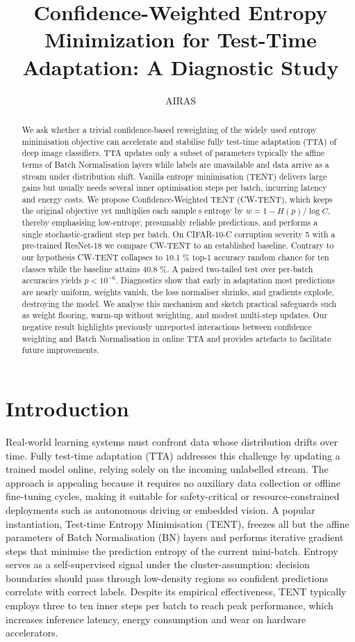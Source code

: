 \documentclass{article} %
\title{Confidence-Weighted Entropy Minimization for Test-Time Adaptation: A Diagnostic Study}
\author{AIRAS}
\begin{document}
\maketitle

\begin{abstract}
We ask whether a trivial confidence-based reweighting of the widely used entropy minimisation objective can accelerate and stabilise fully test-time adaptation (TTA) of deep image classifiers. TTA updates only a subset of parameterstypically the affine terms of Batch Normalisation layerswhile labels are unavailable and data arrive as a stream under distribution shift. Vanilla entropy minimisation (TENT) delivers large gains but usually needs several inner optimisation steps per batch, incurring latency and energy costs. We propose Confidence-Weighted TENT (CW-TENT), which keeps the original objective yet multiplies each samples entropy by \(w = 1 - H(p)/\log C\), thereby emphasising low-entropy, presumably reliable predictions, and performs a single stochastic-gradient step per batch. On CIFAR-10-C corruption severity 5 with a pre-trained ResNet-18 we compare CW-TENT to an established baseline. Contrary to our hypothesis CW-TENT collapses to 10.1 \% top-1 accuracyrandom chance for ten classeswhile the baseline attains 40.8 \%. A paired two-tailed test over per-batch accuracies yields \(p < 10^{-6}\). Diagnostics show that early in adaptation most predictions are nearly uniform, weights vanish, the loss normaliser shrinks, and gradients explode, destroying the model. We analyse this mechanism and sketch practical safeguards such as weight flooring, warm-up without weighting, and modest multi-step updates. Our negative result highlights previously unreported interactions between confidence weighting and Batch Normalisation in online TTA and provides artefacts to facilitate future improvements.
\end{abstract}

\section{Introduction}
\label{sec:intro}
Real-world learning systems must confront data whose distribution drifts over time. Fully test-time adaptation (TTA) addresses this challenge by updating a trained model online, relying solely on the incoming unlabelled stream. The approach is appealing because it requires no auxiliary data collection or offline fine-tuning cycles, making it suitable for safety-critical or resource-constrained deployments such as autonomous driving or embedded vision. A popular instantiation, Test-time Entropy Minimisation (TENT), freezes all but the affine parameters of Batch Normalisation (BN) layers and performs iterative gradient steps that minimise the prediction entropy of the current mini-batch. Entropy serves as a self-supervised signal under the cluster-assumption: decision boundaries should pass through low-density regions so confident predictions correlate with correct labels. Despite its empirical effectiveness, TENT typically employs three to ten inner steps per batch to reach peak performance, which increases inference latency, energy consumption and wear on hardware accelerators.
\end{document}
